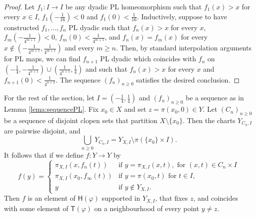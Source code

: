 \documentclass[reqno]{amsart}
\newcommand{\Hphi}{\mathsf{H}(\varphi)}
\newcommand{\Tphi}{\mathsf{T}(\varphi)}
\begin{document}
\begin{proof}
Let $f_1\colon I\to I$ be any dyadic PL homeomorphism such that $f_1(x)>x$ for every $x\in I$, $f_1(-\frac{1}{16})<0$ and $f_1(0)<\frac{1}{16}$. Inductively, suppose to have constructed $f_1,\ldots, f_n$ PL dyadic such that $f_n(x)>x$ for every $x$, $f_m(-\frac{1}{4^{m+1}})<0$, $f_m(0)<\frac{1}{4^{m+1}}$, and $f_n(x)=f_m(x)$  for every $x\notin (-\frac{1}{4^{m+1}}, \frac{1}{4^{m+1}})$ and every $m\ge n$. Then, by standard interpolation arguments for PL maps, we can find $f_{n+1}$ PL dyadic which coincides with $f_n$ on $(-\frac{1}{4}, -\frac{1}{4^{n+1}})\cup(\frac{1}{4^{n+1}}, \frac{1}{4})$ and such that $f_n(x)>x$ for every $x$ and  $f_{n+1}(0)<\frac{1}{4^{n+2}}$. The sequence $(f_n)_{n \geq 0}$ satisfies the desired conclusion. \qedhere
\end{proof}

For the rest of the section, let $I=(-\frac{1}{4}, \frac{1}{4})$ and $(f_n)_{n \geq 0}$ be a sequence as in Lemma \ref{lema:sequencePL}. Fix $x_0\in X$ and set $z=\pi(x_0, 0)\in Y$. Let $(C_n)_{n \geq 0}$ be a sequence of disjoint clopen sets that partition $X\setminus\{x_0\}$. Then the charts $Y_{C_n, I}$ are pairwise disjoint, and \[\bigcup_{n \geq 0} Y_{C_n, I}=Y_{X, I}\setminus\pi(\{x_0\}\times I).\]
It follows that if we define
 $f\colon Y\to Y$  by 
    \begin{equation} f(y)=  \left\{\begin{array}{lr}
      \pi_{X, I}(x, f_n(t))     & \text{if } y=\pi_{X, I} (x, t),  \text{ for }(x, t)\in C_n\times I \\
         \pi_{X, I}(x_0, f_\infty(t))  &  \text{if } y=\pi(x_0, t) \text{ for }t\in I ,\\
        y & \text{if } y\notin Y_{X, I}.
      \end{array}\right. \label{e-elementf} \end{equation}
      Then $f$ is an element of $\Hphi$ supported in $Y_{X, I}$, that fixes $z$, and coincides with some element of $\Tphi$ on a neighbourhood of every point $y\neq z$.
      
\end{document}
